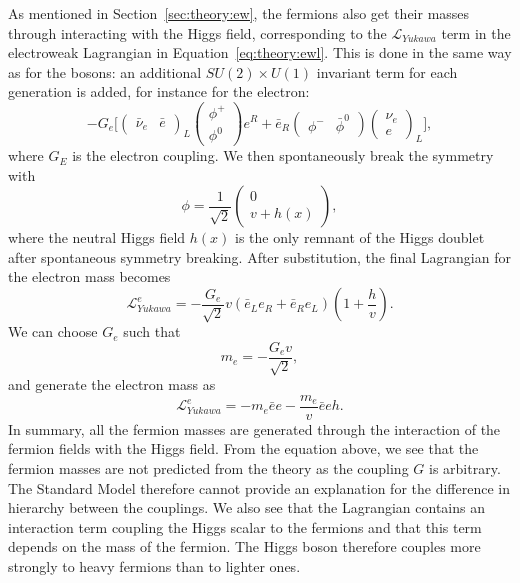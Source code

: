 \par As mentioned in Section~\ref{sec:theory:ew}, the fermions also get their masses through interacting with the Higgs field, corresponding to the $\mathcal{L}_{Yukawa}$ term in the electroweak Lagrangian in Equation~\ref{eq:theory:ewl}. This is done in the same way as for the bosons: an additional $SU(2) \times U(1)$ invariant term for each generation is added, for instance for the electron:
\begin{equation}
  -G_e \bigg[ \begin{pmatrix} \bar{\nu}_e & \bar{e}\end{pmatrix}_L   \begin{pmatrix} \phi^{+} \\ \phi^{0} \end{pmatrix} e^R +
  \bar{e}_R  \begin{pmatrix} \phi^{-} & \bar{\phi}^{0} \end{pmatrix}  \begin{pmatrix} \nu_e \\ e\end{pmatrix}_L  \bigg],
  \end{equation}
where $G_E$ is the electron coupling. We then spontaneously break the symmetry with
\begin{equation}
\phi = \frac{1}{\sqrt{2}}  \begin{pmatrix} 0 \\ v+h(x) \end{pmatrix},
\end{equation}
 where the neutral Higgs field $h(x)$ is the only remnant of the Higgs doublet after spontaneous symmetry breaking. After substitution, the final Lagrangian for the electron mass becomes
 \begin{equation}
   \mathcal{L}_{Yukawa}^e=-\frac{G_e}{\sqrt{2}}v(\bar{e}_L e_R + \bar{e}_R e_L )(1+\frac{h}{v}).
\end{equation}
We can choose $G_e$ such that
\begin{equation}
  m_e=-\frac{G_e v}{\sqrt{2}},
  \end{equation}
and generate the electron mass as
\begin{equation}
  \mathcal{L}_{Yukawa}^e=-m_e \bar{e}e-\frac{m_e}{v} \bar{e}eh.
\end{equation}  
In summary, all the fermion masses are generated through the interaction of the fermion fields with the Higgs field. From the equation above, we see that the fermion masses are not predicted from the theory as the coupling $G$ is arbitrary. The Standard Model therefore cannot provide an explanation for the difference in hierarchy between the couplings. We also see that the Lagrangian contains an interaction term coupling the Higgs scalar to the fermions and that this term depends on the mass of the fermion. The Higgs boson therefore couples more strongly to heavy fermions than to lighter ones.
     
